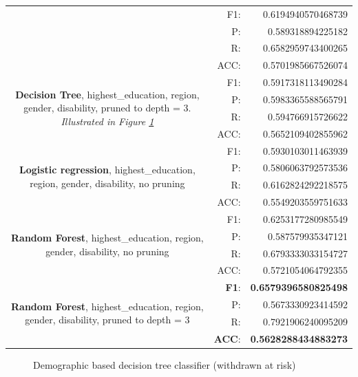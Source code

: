 \documentclass{article}
\begin{document}
\begin{center}
\begin{tabular}{|c|rr|}
&F1:&  0.6194940570468739\\
&P:&   0.589318894225182\\
&R:&   0.6582959743400265\\
&ACC:& 0.5701985667526074\\
\hline
\multirow{4}{10cm}{\textbf{Decision Tree}, highest\_education, region, gender, disability, pruned to depth = 3. \textit{Illustrated in Figure \ref{fig:demographic_dtree_pruned}}}
&F1:&  0.5917318113490284\\
&P:&   0.5983365588565791\\
&R:&   0.594766915726622\\
&ACC:& 0.5652109402855962\\
\hline

\multirow{4}{10cm}{\textbf{Logistic regression}, highest\_education, region, gender, disability, no pruning }
&F1:&  0.5930103011463939 \\
&P:&   0.5806063792573536 \\
&R:&   0.6162824292218575 \\
&ACC:& 0.5549203559751633 \\
\hline
\multirow{4}{10cm}{\textbf{Random Forest}, highest\_education, region, gender, disability, no pruning }
&F1:&  0.6253177280985549 \\
&P:&   0.587579935347121 \\
&R:&   0.6793333033154727 \\
&ACC:& 0.5721054064792355 \\
\hline
\multirow{4}{10cm}{\textbf{Random Forest}, highest\_education, region, gender, disability, pruned to depth = 3}
&\textbf{F1}:&  \textbf{0.6579396580825498} \\
&P:&   0.5673330923414592 \\
&R:&   0.7921906240095209 \\
&\textbf{ACC}:& \textbf{0.5628288434883273} \\
\hline
\end{tabular}
\end{center}
\begin{figure}[ht!]
	\centering
	\caption{Demographic based decision tree classifier (withdrawn at risk)}
	\label{fig:demographic_dtree_pruned}
\end{figure}
\end{document}
